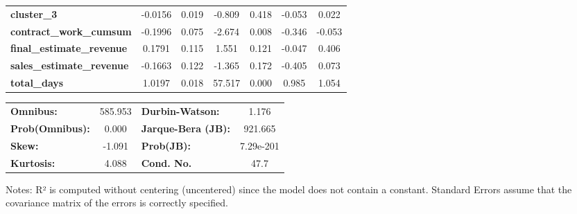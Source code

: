 \begin{center}
\begin{tabular}{lcccccc}
\textbf{cluster\_3}               &      -0.0156  &        0.019     &    -0.809  &         0.418        &       -0.053    &        0.022     \\
\textbf{contract\_work\_cumsum}   &      -0.1996  &        0.075     &    -2.674  &         0.008        &       -0.346    &       -0.053     \\
\textbf{final\_estimate\_revenue} &       0.1791  &        0.115     &     1.551  &         0.121        &       -0.047    &        0.406     \\
\textbf{sales\_estimate\_revenue} &      -0.1663  &        0.122     &    -1.365  &         0.172        &       -0.405    &        0.073     \\
\textbf{total\_days}              &       1.0197  &        0.018     &    57.517  &         0.000        &        0.985    &        1.054     \\
\bottomrule
\end{tabular}
\begin{tabular}{lclc}
\textbf{Omnibus:}       & 585.953 & \textbf{  Durbin-Watson:     } &     1.176  \\
\textbf{Prob(Omnibus):} &   0.000 & \textbf{  Jarque-Bera (JB):  } &   921.665  \\
\textbf{Skew:}          &  -1.091 & \textbf{  Prob(JB):          } & 7.29e-201  \\
\textbf{Kurtosis:}      &   4.088 & \textbf{  Cond. No.          } &      47.7  \\
\bottomrule
\end{tabular}
\end{center}

Notes: \newline
 [1] R² is computed without centering (uncentered) since the model does not contain a constant. \newline
 [2] Standard Errors assume that the covariance matrix of the errors is correctly specified.
